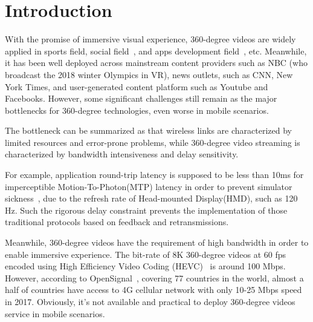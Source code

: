 \section{Introduction}
	
With the promise of immersive visual experience, 360-degree videos are widely applied in sports field, social field~\cite{facebook360}, and apps development field~\cite{google_developers}, etc. Meanwhile, it has been well deployed across mainstream content providers such as NBC (who broadcast the 2018 winter Olympics in VR), news outlets, such as CNN, New York Times, and user-generated content platform such as Youtube and Facebooks.
However, some significant challenges still remain as the major bottlenecks for 360-degree technologies, even worse in mobile scenarios.

The bottleneck can be summarized as that wireless links are characterized by limited resources and error-prone problems, while 360-degree video streaming
is characterized by bandwidth intensiveness and delay sensitivity.

For example, application round-trip latency is supposed to be less than 10ms for imperceptible Motion-To-Photon(MTP) latency in order to prevent simulator sickness~\cite{Simulator_Sickness}, due to the refresh rate of Head-mounted Display(HMD), such as 120 Hz. Such the rigorous delay constraint prevents the implementation of those traditional protocols based on feedback and retransmissions.

Meanwhile, 360-degree videos have the requirement of high bandwidth in order to enable immersive experience. The bit-rate of 8K 360-degree videos at 60 fps encoded using High Efficiency Video Coding (HEVC)~\cite{HEVC} is around 100 Mbps. However, according to OpenSignal~\cite{opensignal}, covering 77 countries in the world, almost a half of countries have access to 4G cellular network with only 10-25 Mbps speed in 2017. Obviously, it's not available and practical to deploy 360-degree videos service in mobile scenarios.    

